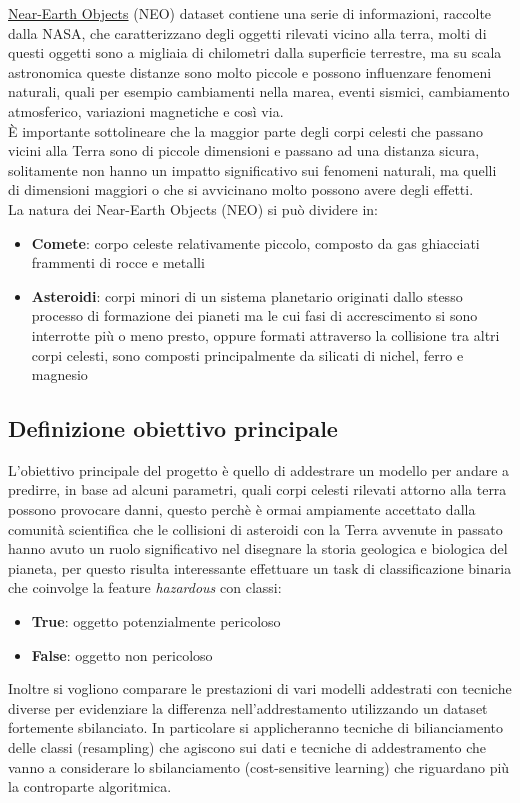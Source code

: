 \documentclass[italian,12pt,a4paper]{article}
\begin{document}
	\href{https://www.kaggle.com/datasets/sameepvani/nasa-nearest-earth-objects/}{Near-Earth Objects} (NEO) dataset contiene una serie di informazioni, raccolte dalla NASA, che caratterizzano degli oggetti rilevati vicino alla terra, molti di questi oggetti sono a migliaia di chilometri dalla superficie terrestre, ma su scala astronomica queste distanze sono molto piccole e possono influenzare fenomeni naturali, quali per esempio cambiamenti nella marea, eventi sismici, cambiamento atmosferico, variazioni magnetiche e così via. \\
	È importante sottolineare che la maggior parte degli corpi celesti che passano vicini alla Terra sono di piccole dimensioni e passano ad una distanza sicura, solitamente non hanno un impatto significativo sui fenomeni naturali, ma quelli di dimensioni maggiori o che si avvicinano molto possono avere degli effetti. \\
	\linebreak
	La natura dei Near-Earth Objects (NEO) si può dividere in:
	\begin{itemize}
		\item \textbf{Comete}: corpo celeste relativamente piccolo, composto da gas ghiacciati frammenti di rocce e metalli
		\item \textbf{Asteroidi}: corpi minori di un sistema planetario originati dallo stesso processo di formazione dei pianeti ma le cui fasi di accrescimento si sono interrotte più o meno presto, oppure formati attraverso la collisione tra altri corpi celesti, sono composti principalmente da silicati di nichel, ferro e magnesio
	\end{itemize}

	
	\subsection{Definizione obiettivo principale}
	L'obiettivo principale del progetto è quello di addestrare un modello per andare a predirre, in base ad alcuni parametri, quali corpi celesti rilevati attorno alla terra possono provocare danni, questo perchè è ormai ampiamente accettato dalla comunità scientifica che le collisioni di asteroidi con la Terra avvenute in passato hanno avuto un ruolo significativo nel disegnare la storia geologica e biologica del pianeta, per questo risulta interessante effettuare un task di classificazione binaria che coinvolge la feature \textit{hazardous} con classi:
	\begin{itemize}
		\item \textbf{True}: oggetto potenzialmente pericoloso
		\item \textbf{False}: oggetto non pericoloso
	\end{itemize}
	Inoltre si vogliono comparare le prestazioni di vari modelli addestrati con tecniche diverse per evidenziare la differenza nell'addrestamento utilizzando un dataset fortemente sbilanciato.
	In particolare si applicheranno tecniche di bilianciamento delle classi (resampling) che agiscono sui dati e tecniche di addestramento che vanno a considerare lo sbilanciamento (cost-sensitive learning) che riguardano più la controparte algoritmica. 
	
\end{document}
